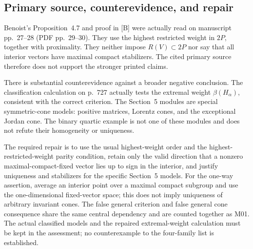 \documentclass[10pt]{article}
\begin{document}
\subsection*{Primary source, counterevidence, and repair}
Benoist’s Proposition 4.7 and proof in [B] were actually read on manuscript pp. 27–28 (PDF pp. 29–30). They use the highest restricted weight in \(2P\), together with proximality. They neither impose \(R(V)\subset2P\) nor say that all interior vectors have maximal compact stabilizers. The cited primary source therefore does not support the stronger printed claims.\par
There is substantial counterevidence against a broader negative conclusion. The classification calculation on p. 727 actually tests the extremal weight \(\beta(H_\alpha)\), consistent with the correct criterion. The Section 5 modules are special symmetric-cone models: positive matrices, Lorentz cones, and the exceptional Jordan cone. The binary quartic example is not one of these modules and does not refute their homogeneity or uniqueness.\par
The required repair is to use the usual highest-weight order and the highest-restricted-weight parity condition, retain only the valid direction that a nonzero maximal-compact-fixed vector lies up to sign in the interior, and justify uniqueness and stabilizers for the specific Section 5 models. For the one-way assertion, average an interior point over a maximal compact subgroup and use the one-dimensional fixed-vector space; this does not imply uniqueness of arbitrary invariant cones. The false general criterion and false general cone consequence share the same central dependency and are counted together as M01. The actual classified models and the repaired extremal-weight calculation must be kept in the assessment; no counterexample to the four-family list is established.\par
\end{document}
